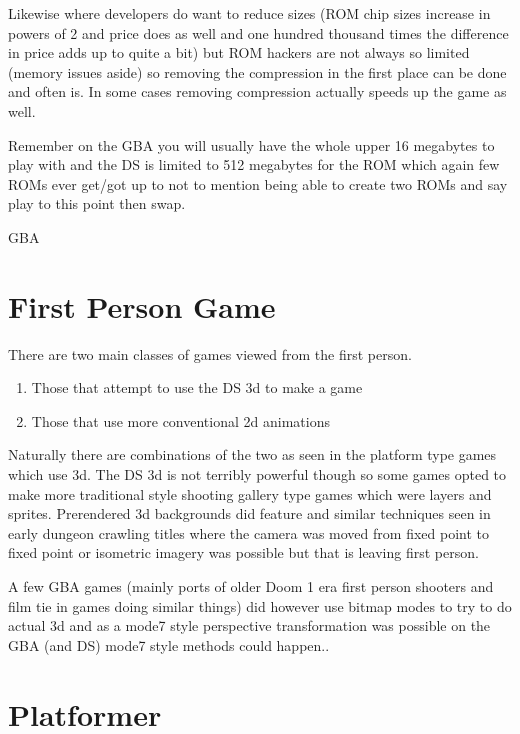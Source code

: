 \documentclass[
]{book}
\providecommand{\tightlist}{%
  \setlength{\itemsep}{0pt}\setlength{\parskip}{0pt}}
\begin{document}
Likewise where developers do want to reduce sizes (ROM chip sizes increase in powers of 2 and price does as well and one hundred thousand times the difference in price adds up to quite a bit) but ROM hackers are not always so limited (memory issues aside) so removing the compression in the first place can be done and often is. In some cases removing compression actually speeds up the game as well.

Remember on the GBA you will usually have the whole upper 16 megabytes to play with and the DS is limited to 512 megabytes for the ROM which again few ROMs ever get/got up to not to mention being able to create two ROMs and say play to this point then swap.

GBA

\hypertarget{first-person-game}{%
\section{First Person Game}\label{first-person-game}}

There are two main classes of games viewed from the first person.

\begin{enumerate}
\def\labelenumi{\arabic{enumi}.}
\tightlist
\item
  Those that attempt to use the DS 3d to make a game
\item
  Those that use more conventional 2d animations
\end{enumerate}

Naturally there are combinations of the two as seen in the platform type games which use 3d. The DS 3d is not terribly powerful though so some games opted to make more traditional style shooting gallery type games which were layers and sprites. Prerendered 3d backgrounds did feature and similar techniques seen in early dungeon crawling titles where the camera was moved from fixed point to fixed point or isometric imagery was possible but that is leaving first person.

A few GBA games (mainly ports of older Doom 1 era first person shooters and film tie in games doing similar things) did however use bitmap modes to try to do actual 3d and as a mode7 style perspective transformation was possible on the GBA (and DS) mode7 style methods could happen..

\hypertarget{platformer}{%
\section{Platformer}\label{platformer}}
\end{document}
